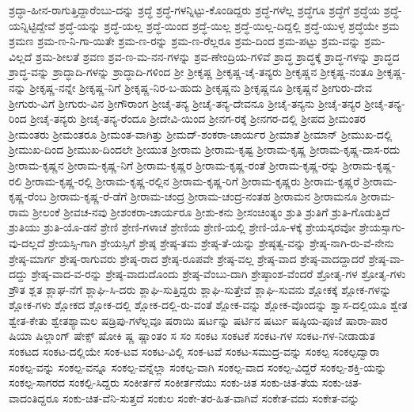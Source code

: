 {ಶ್ರದ್ಧಾ-ಹೀನ-ರಾಗುತ್ತಿದ್ದಾರೆಂಬು-ದನ್ನು
ಶ್ರದ್ಧೆ
ಶ್ರದ್ಧೆ-ಗಳನ್ನಿಟ್ಟು-ಕೊಂಡಿದ್ದರು
ಶ್ರದ್ಧೆ-ಗಳೆಲ್ಲ
ಶ್ರದ್ಧೆಗೂ
ಶ್ರದ್ಧೆಗೆ
ಶ್ರದ್ಧೆಯ
ಶ್ರದ್ಧೆ-ಯನ್ನಿಟ್ಟಿದ್ದೇವೆ
ಶ್ರದ್ಧೆ-ಯನ್ನು
ಶ್ರದ್ಧೆ-ಯಲ್ಲ
ಶ್ರದ್ಧೆ-ಯಿಂದ
ಶ್ರದ್ಧೆ-ಯಿಲ್ಲ
ಶ್ರದ್ಧೆ-ಯಿಲ್ಲ-ದಿದ್ದಲ್ಲಿ
ಶ್ರದ್ಧೆ-ಯುಳ್ಳ
ಶ್ರದ್ಧೆಯೇ
ಶ್ರಮ
ಶ್ರಮಣ
ಶ್ರಮ-ಣ-ನಿ-ಗಾ-ಯಿತೇ
ಶ್ರಮ-ಣ-ರನ್ನು
ಶ್ರಮ-ಣ-ರೆಲ್ಲರೂ
ಶ್ರಮ-ದಿಂದ
ಶ್ರಮ-ಪಟ್ಟು
ಶ್ರಮ-ವನ್ನು
ಶ್ರಮ-ವಿಲ್ಲದೆ
ಶ್ರಮ-ಶೀಲತೆ
ಶ್ರವಣ
ಶ್ರವ-ಣ-ಮ-ನನ-ಗಳನ್ನು
ಶ್ರವ-ಣೇಂದ್ರಿಯ-ಗಳಿವೆ
ಶ್ರಾದ್ಧ
ಶ್ರಾದ್ಧಕ್ಕೆ
ಶ್ರಾದ್ಧ-ಗಳನ್ನು
ಶ್ರಾದ್ಧದ
ಶ್ರಾದ್ಧ-ವನ್ನು
ಶ್ರಾದ್ಧಾದಿ-ಗಳನ್ನು
ಶ್ರಾದ್ಧಾದಿ-ಗಳಿಂದ
ಶ್ರೀ
ಶ್ರೀಕೃಷ್ಣ
ಶ್ರೀಕೃಷ್ಣ-ಚೈ-ತನ್ಯರು
ಶ್ರೀಕೃಷ್ಣನ
ಶ್ರೀಕೃಷ್ಣ-ನಂತೂ
ಶ್ರೀಕೃಷ್ಣ-ನನ್ನು
ಶ್ರೀಕೃಷ್ಣ-ನನ್ನೇ
ಶ್ರೀಕೃಷ್ಣ-ನಿಗೆ
ಶ್ರೀಕೃಷ್ಣ-ನಿರ-ಬ-ಹುದು
ಶ್ರೀಕೃಷ್ಣನು
ಶ್ರೀಕೃಷ್ಣನೂ
ಶ್ರೀಕೃಷ್ಣನೆ
ಶ್ರೀಗುರು-ದೇವ
ಶ್ರೀಗುರು-ವಿಗೆ
ಶ್ರೀಗುರು-ವಿನ
ಶ್ರೀಗೌರಾಂಗ
ಶ್ರೀಚೈ-ತನ್ಯ
ಶ್ರೀಚೈ-ತನ್ಯ-ದೇವನೂ
ಶ್ರೀಚೈ-ತನ್ಯನು
ಶ್ರೀಚೈ-ತನ್ಯರ
ಶ್ರೀಚೈ-ತನ್ಯ-ರಿಂದ
ಶ್ರೀಚೈ-ತನ್ಯರು
ಶ್ರೀಚೈ-ತನ್ಯ-ರೆಂದೂ
ಶ್ರೀದೇವಿ-ಯಿಂದ
ಶ್ರೀನಗ-ರಕ್ಕೆ
ಶ್ರೀನಗರ-ದಲ್ಲಿ
ಶ್ರೀಪದ
ಶ್ರೀಮಂತರ
ಶ್ರೀಮಂತರು
ಶ್ರೀಮಂತರೂ
ಶ್ರೀಮಂತ-ವಾಗಿತ್ತು
ಶ್ರೀಮದ್-ಶಂಕರಾ-ಚಾರ್ಯರ
ಶ್ರೀಮಾತೆ
ಶ್ರೀಮಾನ್
ಶ್ರೀಮುಖ-ದಲ್ಲಿ
ಶ್ರೀಮುಖ-ದಿಂದ
ಶ್ರೀಮುಖ-ದಿಂದಲೇ
ಶ್ರೀಯುತ
ಶ್ರೀರಾಮ
ಶ್ರೀರಾಮ-ಕೃಷ್ಟ
ಶ್ರೀರಾಮ-ಕೃಷ್ಣ
ಶ್ರೀರಾಮ-ಕೃಷ್ಣ-ದಾಸ-ರದು
ಶ್ರೀರಾಮ-ಕೃಷ್ಣನ
ಶ್ರೀರಾಮ-ಕೃಷ್ಣ-ನಿಗೆ
ಶ್ರೀರಾಮ-ಕೃಷ್ಣರ
ಶ್ರೀರಾಮ-ಕೃಷ್ಣ-ರಂತೆ
ಶ್ರೀರಾಮ-ಕೃಷ್ಣ-ರನ್ನು
ಶ್ರೀರಾಮ-ಕೃಷ್ಣ-ರಲಿ
ಶ್ರೀರಾಮ-ಕೃಷ್ಣ-ರಲ್ಲಿ
ಶ್ರೀರಾಮ-ಕೃಷ್ಣ-ರಲ್ಲಿನ
ಶ್ರೀರಾಮ-ಕೃಷ್ಣ-ರಿಗೆ
ಶ್ರೀರಾಮ-ಕೃಷ್ಣರು
ಶ್ರೀರಾಮ-ಕೃಷ್ಣರೆ
ಶ್ರೀರಾಮ-ಕೃಷ್ಣ-ರೆಂಬ
ಶ್ರೀರಾಮ-ಕೃಷ್ಣ-ರೆ-ಡೆಗೆ
ಶ್ರೀರಾಮ-ಚಂದ್ರ
ಶ್ರೀರಾಮ-ಚಂದ್ರ-ನಂತಹ
ಶ್ರೀರಾಮನ
ಶ್ರೀರಾಮನೂ
ಶ್ರೀರಾಮ-ರಾಮ
ಶ್ರೀಲಂಕೆ
ಶ್ರೀವಚ-ನವು
ಶ್ರೀಶಂಕರಾ-ಚಾರ್ಯರೂ
ಶ್ರೀಶು-ಕನು
ಶ್ರೀಸಂಚಿಂತ್ಯಂ
ಶ್ರುತಿ
ಶ್ರುತಿಗೆ
ಶ್ರುತಿ-ಗೊಡುತ್ತಿದೆ
ಶ್ರುತಿಯು
ಶ್ರುತಿ-ಯೊ-ಡನೆ
ಶ್ರೇಣಿ
ಶ್ರೇಣಿ-ಗಳಾಚೆ
ಶ್ರೇಣಿಯ
ಶ್ರೇಣಿ-ಯಲ್ಲಿ
ಶ್ರೇಣಿ-ಯೊ-ಳಕ್ಕೆ
ಶ್ರೇಯಸ್ಕರವೋ
ಶ್ರೇಯಸ್ಸಾಗು-ವು-ದಲ್ಲದೆ
ಶ್ರೇಯಸ್ಸಿ-ಗಾಗಿ
ಶ್ರೇಯಸ್ಸಿಗೆ
ಶ್ರೇಷ್ಠ
ಶ್ರೇಷ್ಠ-ತಮ
ಶ್ರೇಷ್ಠ-ತೆ-ಯನ್ನು
ಶ್ರೇಷ್ಠತ್ವ-ವನ್ನು
ಶ್ರೇಷ್ಠ-ನಾಗಿ-ರು-ವೆ-ನೇನು
ಶ್ರೇಷ್ಠ-ಮಾರ್ಗ
ಶ್ರೇಷ್ಠ-ರಾಗುವರು
ಶ್ರೇಷ್ಠ-ರಾದ
ಶ್ರೇಷ್ಠ-ರೂಪವೇ
ಶ್ರೇಷ್ಠ-ವಲ್ಲ
ಶ್ರೇಷ್ಠ-ವಾದ
ಶ್ರೇಷ್ಠ-ವಾದದ್ದಾದರೆ
ಶ್ರೇಷ್ಠ-ವಾ-ದದ್ದು
ಶ್ರೇಷ್ಠ-ವಾದ-ವ-ರನ್ನು
ಶ್ರೇಷ್ಠ-ವಾದುದೊಂದು
ಶ್ರೇಷ್ಠ-ವೆಂಬು-ದಾಗಿ
ಶ್ರೇಷ್ಠಾಂಶ-ವೆಂದರೆ
ಶ್ರೋತೃ-ಗಳ
ಶ್ರೋತೃ-ಗಳು
ಶ್ರೌತ
ಶ್ಲತ
ಶ್ಲಾಘ-ನೆಗೆ
ಶ್ಲಾಘಿ-ಸಿ-ದರು
ಶ್ಲಾಘಿ-ಸುತ್ತಿದ್ದರು
ಶ್ಲಾಘಿ-ಸುತ್ತೇವೆ
ಶ್ಲಾಘಿ-ಸುವನು
ಶ್ಲೋಕಕ್ಕೆ
ಶ್ಲೋಕ-ಗಳನ್ನು
ಶ್ಲೋಕ-ಗಳು
ಶ್ಲೋಕದ
ಶ್ಲೋಕ-ದಲ್ಲಿ
ಶ್ಲೋಕ-ದಲ್ಲಿ-ರು-ವಂತೆ
ಶ್ಲೋಕ-ವನ್ನು
ಶ್ಲೋಕ-ವೊಂದನ್ನು
ಶ್ವಾಸ-ದಲ್ಲಿಯೂ
ಶ್ವೇತ
ಶ್ವೇತ-ಕೇತು
ಶ್ವೇತಶ್ಯಾಮಲ
ಷಡ್ರಿಪು-ಗಳೆಲ್ಲವೂ
ಷರಾಯಿ
ಷರ್ಟನ್ನು
ಷರ್ಟಿನ
ಷರ್ಟು
ಷಷ್ಠಿಯ-ಪೂಜೆ
ಷಾರಾ-ಪಾರ
ಷಿಯಾ
ಷಿಲ್ಲಾಂಗ್
ಷೇಕ್ಸ್
ಷೋಕಿ
ಷ್ಣ
ಷ್ಣಾಂತಂ
ಸ
ಸಂ
ಸಂಕಟ
ಸಂಕಟಕೆ
ಸಂಕಟ-ಗಳ
ಸಂಕಟ-ಗಳ-ನೀಡಾಡುತ
ಸಂಕಟದ
ಸಂಕಟ-ದಲ್ಲಿಯೇ
ಸಂಕ-ಟವ
ಸಂಕಟ-ವಿಲ್ಲಿ
ಸಂಕ-ಟವೆ
ಸಂಕಟ-ಸಮುದ್ರ-ವನ್ನು
ಸಂಕಲ್ಪ
ಸಂಕಲ್ಪದ್ವಾರಾ
ಸಂಕಲ್ಪ-ವನ್ನು
ಸಂಕಲ್ಪ-ವನ್ನೂ
ಸಂಕಲ್ಪ-ವನ್ನೆಲ್ಲಾ
ಸಂಕಲ್ಪ-ವಾಗಿ
ಸಂಕಲ್ಪ-ವಾದ
ಸಂಕಲ್ಪ-ವಿದ್ದರೆ
ಸಂಕಲ್ಪ-ಶಕ್ತಿ-ಯನ್ನು
ಸಂಕಲ್ಪ-ಸಾಗರದ
ಸಂಕಲ್ಪಿ-ಸಿದ್ದರು
ಸಂಕೀರ್ತನೆ
ಸಂಕೀರ್ತನೆಯು
ಸಂಕು-ಚಿತ
ಸಂಕು-ಚಿತ-ತೆಯ
ಸಂಕು-ಚಿತ-ವಾದಂತಿದ್ದರೂ
ಸಂಕು-ಚಿತ-ವೆನಿ-ಸುತ್ತದೆ
ಸಂಕುಲ
ಸಂಕೇ-ತರ-ಹಿತ-ವಾಗಿವೆ
ಸಂಕೇತ-ವದು
ಸಂಕೇತ-ವನ್ನು
}
